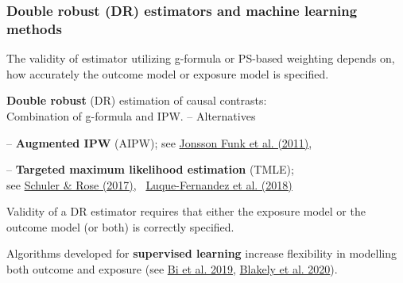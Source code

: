 \documentclass[12pt,dvipsnames,t,aspectratio=169, handout%
]{beamer}
\begin{document}
\begin{frame}
\frametitle{Double robust (DR) estimators and machine learning methods}
\bi
\item
The validity of estimator utilizing g-formula or PS-based weighting depends on, how accurately
the outcome model or exposure model is specified.
\pause
\medskip
\item
{\bf Double robust} (DR) estimation 
of causal contrasts: \\
Combination of g-formula and IPW.
\pause 
-- Alternatives
\bi
{\normalsize
\item[--]
 {\bf Augmented IPW} (AIPW); {\small see \href{https://doi.org/10.1093/aje/kwq439}{\color{blue}Jonsson Funk et al. (2011)}},\\
\medskip
\item[--] {\bf Targeted maximum likelihood estimation} (TMLE); \\ 
 {\small see \href{https://doi.org/10.1093/aje/kww165}{\color{blue}Schuler \& Rose (2017)}, \
  \href{https://doi.org/10.1002/sim.7628}{\color{blue}Luque-Fernandez et al. (2018)}} 
}
\ei
\pause
Validity of a DR estimator requires that either the exposure model 
or the outcome model (or both) is correctly specified.
\pause
\medskip
\item Algorithms developed for {\bf supervised learning} 
increase flexibility in modelling both outcome and exposure 
{\small (see \href{https://doi.org/10.1093/aje/kwz189}{\color{blue}Bi et al. 2019}, 
\href{https://doi.org/10.1093/ije/dyz132}{\color{blue}Blakely et al. 2020})}.
\ei 
\end{frame}
\end{document}
